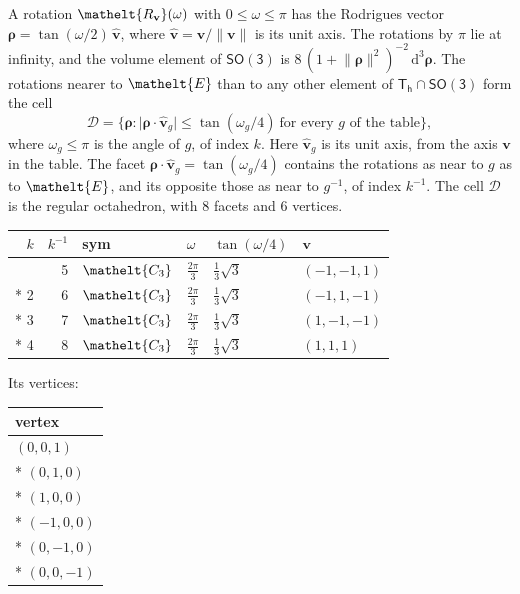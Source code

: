 \documentclass[10pt,a4paper]{article}
\numberwithin{equation}{section}
\newcommand{\eltfont}[1]{{\let\sigma\eltsigma\mathelt{#1}}}
\newcommand{\grp}[1]{\mathsf{#1}}
\newcommand{\cls}[1]{\eltfont{#1}}
\newcommand{\elt}[1]{\eltfont{#1}}
\newcommand{\dirvec}[3]{(#1, #2, #3)}
\newcommand{\unitaxis}{\hat{\mathbf{v}}}
\newcommand{\vv}{\mathbf{v}}
\newcommand{\diff}{\mathrm{d}}
\newcommand{\rodrigues}{\boldsymbol{\rho}}
\newcommand{\fcell}{\mathcal{D}}
\begin{document}
\leavevmode\label{n:vector.rodrigues}\label{n:vector.unitaxis}A rotation $\elt{R_{\vv}}(\omega)$ with $0 \le \omega \le \pi$ has the Rodrigues vector $\rodrigues = \tan(\omega/2)\,\unitaxis$, where $\unitaxis = \vv/\lVert\vv\rVert$ is its unit axis. The rotations by $\pi$ lie at infinity, and the volume element of \href{SO3.pdf}{$\grp{SO(3)}$} is $8\,(1 + \lVert\rodrigues\rVert^2)^{-2}\,\diff^3\rodrigues$.
\leavevmode\label{n:set.cell}The rotations nearer to $\elt{E}$ than to any other element of $\grp{T_{h}} \cap \grp{SO(3)}$ form the cell
\begin{equation}\label{e:cell}\fcell = \bigl\{\rodrigues : \lvert\rodrigues\cdot\unitaxis_g\rvert \le \tan(\omega_g/4)\ \text{for every $g$ of the table}\bigr\},\end{equation}
where $\omega_g \le \pi$ is the angle of $g$, of index $k$. Here $\unitaxis_g$ is its unit axis, from the axis $\vv$ in the table. The facet $\rodrigues\cdot\unitaxis_g = \tan(\omega_g/4)$ contains the rotations as near to $g$ as to $\elt{E}$, and its opposite those as near to $g^{-1}$, of index $k^{-1}$. The cell $\fcell$ is the regular octahedron, with 8 facets and 6 vertices.
{\small{\renewcommand{\arraystretch}{1.3}\begin{longtable}{@{}rrllll@{}}\toprule
$k$ & $k^{-1}$ & sym & $\omega$ & $\tan(\omega/4)$ & $\vv$\\\midrule\endhead
\bottomrule\endfoot\endlastfoot
1 & 5 & $\cls{C_{3}}$ & $\tfrac{2\pi}{3}$ & $\tfrac{1}{3}\sqrt{3}$ & $\dirvec{-1}{-1}{1}$\\*
2 & 6 & $\cls{C_{3}}$ & $\tfrac{2\pi}{3}$ & $\tfrac{1}{3}\sqrt{3}$ & $\dirvec{-1}{1}{-1}$\\*
3 & 7 & $\cls{C_{3}}$ & $\tfrac{2\pi}{3}$ & $\tfrac{1}{3}\sqrt{3}$ & $\dirvec{1}{-1}{-1}$\\*
4 & 8 & $\cls{C_{3}}$ & $\tfrac{2\pi}{3}$ & $\tfrac{1}{3}\sqrt{3}$ & $\dirvec{1}{1}{1}$\\
\bottomrule\end{longtable}}}
\leavevmode\label{n:head.vertex}Its vertices:
{\small\begin{longtable}{@{}l@{}}\toprule
vertex\\\midrule\endhead
\bottomrule\endfoot\endlastfoot
$(0, 0, 1)$\\*
$(0, 1, 0)$\\*
$(1, 0, 0)$\\*
$(-1, 0, 0)$\\*
$(0, -1, 0)$\\*
$(0, 0, -1)$\\
\bottomrule\end{longtable}}
\end{document}

